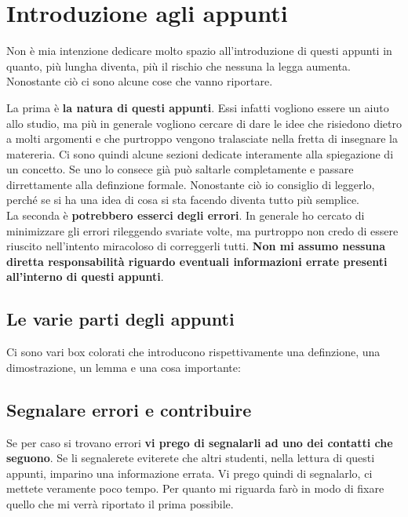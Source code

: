 \section{Introduzione agli appunti}

Non è mia intenzione dedicare molto spazio all'introduzione di questi appunti in quanto, più lungha diventa, più il rischio che nessuna la legga aumenta. Nonostante ciò ci sono alcune cose che vanno riportare. 

La prima è \textbf{la natura di questi appunti}. Essi infatti vogliono essere un aiuto allo studio, ma più in generale vogliono cercare di dare le idee che risiedono dietro a molti argomenti e che purtroppo vengono tralasciate nella fretta di insegnare la matereria. Ci sono quindi alcune sezioni dedicate interamente alla spiegazione di un concetto. Se uno lo consece già può saltarle completamente e passare dirrettamente alla definzione formale. Nonostante ciò io consiglio di leggerlo, perché se si ha una idea di cosa si sta facendo diventa tutto più semplice.\\

La seconda è \textbf{potrebbero esserci degli errori}. In generale ho cercato di minimizzare gli errori rileggendo svariate volte, ma purtroppo non credo di essere riuscito nell'intento miracoloso di correggerli tutti. \textbf{Non mi assumo nessuna diretta responsabilità riguardo eventuali informazioni errate presenti all'interno di questi appunti}.

\subsection{Le varie parti degli appunti}
Ci sono vari box colorati che introducono rispettivamente una definzione, una dimostrazione, un lemma e una cosa importante:






\subsection{Segnalare errori e contribuire}
Se per caso si trovano errori \textbf{vi prego di segnalarli ad uno dei contatti che seguono}. Se li segnalerete eviterete che altri studenti, nella lettura di questi appunti, imparino una informazione errata. Vi prego quindi di segnalarlo, ci mettete veramente poco tempo. Per quanto mi riguarda farò in modo di fixare quello che mi verrà riportato il prima possibile.\\

